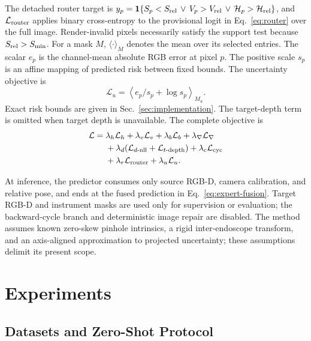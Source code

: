 \documentclass[letterpaper,10pt,conference]{ieeeconf}
\begin{document}
The detached router target is
$y_p=\mathbf{1}\{S_p<S_{\rm rel}\,\lor\,V_p>V_{\rm rel}\,\lor\,
\mathcal H_p>\mathcal H_{\rm rel}\}$, and $\mathcal L_{\rm router}$ applies
binary cross-entropy to the provisional logit in Eq.~\eqref{eq:router} over
the full image. Render-invalid pixels
necessarily satisfy the support test because $S_{\rm rel}>S_{\min}$. For a
mask $M$, $\langle\cdot\rangle_M$ denotes the mean over its selected entries.
The scalar $e_p$ is the channel-mean absolute RGB error at pixel $p$. The
positive scale $s_p$ is an affine mapping of predicted risk between fixed
bounds. The uncertainty objective is
\begin{equation}
 \mathcal L_u
 =\left\langle e_p/s_p+\log s_p\right\rangle_{M_u}.
\label{eq:risk-loss}
\end{equation}
Exact risk bounds are given in Sec.~\ref{sec:implementation}. The target-depth
term is omitted when target depth is unavailable. The complete objective is
\begin{equation}
\begin{aligned}
 \mathcal L={}&\lambda_h\mathcal L_h+\lambda_v\mathcal L_v
 +\lambda_b\mathcal L_b+\lambda_\nabla\mathcal L_\nabla\\
 &+\lambda_d(\mathcal L_{d\text{-nll}}+\mathcal L_{t\text{-depth}})
 +\lambda_c\mathcal L_{\rm cyc}\\
 &+\lambda_r\mathcal L_{\rm router}+\lambda_u\mathcal L_u.
\end{aligned}
\label{eq:total-loss}
\end{equation}

At inference, the predictor consumes only source RGB-D, camera calibration,
and relative pose, and ends at the fused prediction in
Eq.~\eqref{eq:expert-fusion}. Target RGB-D and instrument masks are used only
for supervision or evaluation; the backward-cycle branch and deterministic
image repair are disabled. The method assumes known
zero-skew pinhole intrinsics, a rigid inter-endoscope transform, and an
axis-aligned approximation to projected uncertainty; these assumptions delimit
its present scope.

\section{Experiments}
\label{sec:experiments}

\subsection{Datasets and Zero-Shot Protocol}
\end{document}
